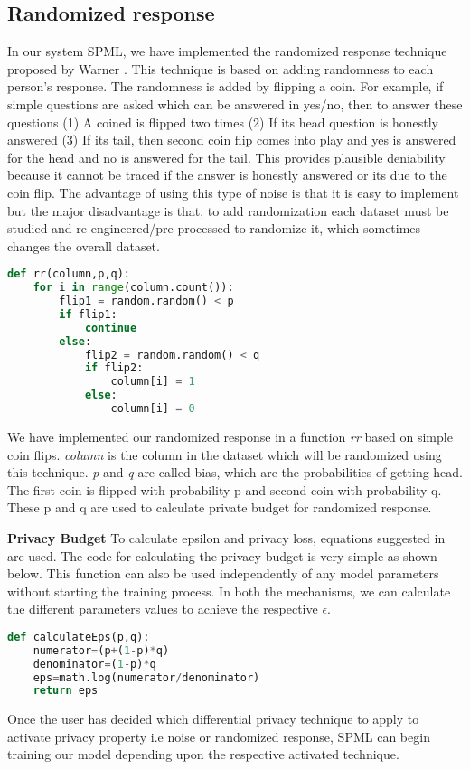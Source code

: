 \subsection{Randomized response}
\label{sec:implementationRR}
In our system SPML, we have implemented the randomized response technique proposed by Warner \cite{14}. This technique is based on adding randomness to each person's response. The randomness is added by flipping a coin. For example, if simple questions are asked which can be answered in yes/no, then to answer these questions (1) A coined is flipped two times (2) If its head question is honestly answered (3) If its tail, then second coin flip comes into play and yes is answered for the head and no is answered for the tail. This provides plausible deniability because it cannot be traced if the answer is honestly answered or its due to the coin flip. The advantage of using this type of noise is that it is easy to implement but the major disadvantage is that, to add randomization each dataset must be studied and re-engineered/pre-processed to randomize it, which sometimes changes the overall dataset.
\linebreak
\begin{lstlisting}[language=Python]
def rr(column,p,q):
    for i in range(column.count()):
        flip1 = random.random() < p
        if flip1:
            continue
        else:
            flip2 = random.random() < q
            if flip2:
                column[i] = 1
            else:
                column[i] = 0
\end{lstlisting}
We have implemented our randomized response in a function \textit{rr}  based on simple coin flips. \textit{column} is the column in the dataset which will be randomized using this technique. \textit{p} and \textit{q} are called bias, which are the probabilities of getting head. The first coin is flipped with probability p and second coin with probability q. These p and q are used to calculate private budget for randomized response.\linebreak

\textbf{Privacy Budget}
To calculate epsilon and privacy loss, equations suggested in \cite{18} are used. The code for calculating the privacy budget is very simple as shown below. This function can also be used independently of any model parameters without starting the training process. In both the mechanisms, we can calculate the different parameters values to achieve the respective $\epsilon$.
\linebreak
\begin{lstlisting}[language=Python]
def calculateEps(p,q):
    numerator=(p+(1-p)*q)
    denominator=(1-p)*q
    eps=math.log(numerator/denominator)
    return eps
\end{lstlisting}
Once the user has decided which differential privacy technique to apply to activate privacy property i.e noise or randomized response, SPML can begin training our model depending upon the respective activated technique. 

